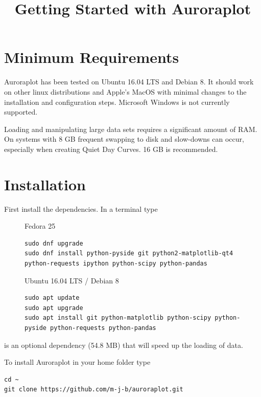 \documentclass{article}
\begin{document}
\title{Getting Started with Auroraplot}
\maketitle

\section{Minimum Requirements}

Auroraplot has been tested on Ubuntu 16.04 LTS and Debian 8.
It should work on other linux distributions and Apple's MacOS with minimal changes to the installation and configuration steps. Microsoft Windows is not currently supported.

Loading and manipulating large data sets requires a significant amount of RAM.
On systems with 8 GB frequent swapping to disk and slow-downs can occur,
especially when creating Quiet Day Curves. 16 GB is recommended.

\section{Installation}
\label{install}

First install the dependencies. In a terminal type

\begin{figure}[htb!]
\begin{minipage}[b]{0.45\linewidth}
Fedora 25
\begin{lstlisting}
sudo dnf upgrade
sudo dnf install python-pyside git python2-matplotlib-qt4 python-requests ipython python-scipy python-pandas
\end{lstlisting}
\end{minipage}
\hspace{0.5cm}
\begin{minipage}[b]{0.45\linewidth}
Ubuntu 16.04 LTS / Debian 8
\begin{lstlisting}
sudo apt update
sudo apt upgrade                 
sudo apt install git python-matplotlib python-scipy python-pyside python-requests python-pandas 
\end{lstlisting}
\end{minipage} 
\end{figure}

 is an optional dependency (54.8 MB) that will speed up the loading of data.

To install Auroraplot in your home folder type
\begin{lstlisting}
cd ~
git clone https://github.com/m-j-b/auroraplot.git
\end{lstlisting}
\end{document}
